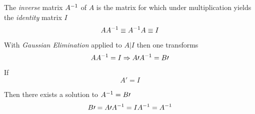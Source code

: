 \begin{definition}
    The \textit{inverse} matrix ${A}^{-1}$ of $A$ is the matrix for which under multiplication yields the \textit{identity} matrix $I$
    \begin{equation}
        A {A}^{-1} \equiv {A}^{-1} A \equiv I
    \end{equation}
    
    With \textit{Gaussian Elimination} applied to $A \vert I$ then one transforms
    \begin{equation}
        A {A}^{-1} = I \Rightarrow A\prime {A}^{-1} = B\prime
    \end{equation}
    
    If
    \begin{equation}
        A\prime = I
    \end{equation}
    
    Then there exists a solution to ${A}^{-1} = B\prime$
    \begin{equation}
        B\prime = A\prime {A}^{-1} = I {A}^{-1} = {A}^{-1}
    \end{equation}
\end{definition}
